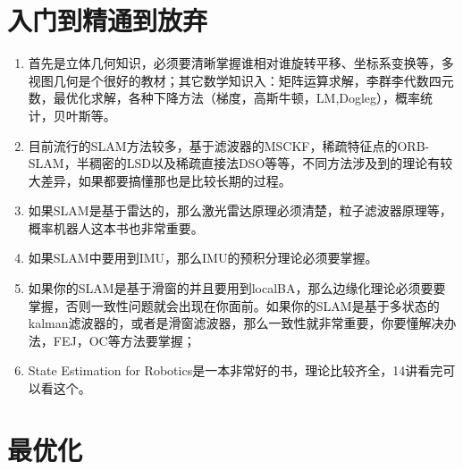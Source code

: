 \documentclass[]{elegantbook}
\author{龚正茂}
\date{\today}
\begin{document}
\maketitle
\tableofcontents  %
\mainmatter  		%









\chapter{入门到精通到放弃}

\begin{enumerate}
	\item 首先是立体几何知识，必须要清晰掌握谁相对谁旋转平移、坐标系变换等，多视图几何是个很好的教材；其它数学知识入：矩阵运算求解，李群李代数四元数，最优化求解，各种下降方法（梯度，高斯牛顿，LM,Dogleg），概率统计，贝叶斯等。
	\item 目前流行的SLAM方法较多，基于滤波器的MSCKF，稀疏特征点的ORB-SLAM，半稠密的LSD以及稀疏直接法DSO等等，不同方法涉及到的理论有较大差异，如果都要搞懂那也是比较长期的过程。
	\item 如果SLAM是基于雷达的，那么激光雷达原理必须清楚，粒子滤波器原理等，概率机器人这本书也非常重要。
	\item 如果SLAM中要用到IMU，那么IMU的预积分理论必须要掌握。
	\item 如果你的SLAM是基于滑窗的并且要用到localBA，那么边缘化理论必须要要掌握，否则一致性问题就会出现在你面前。如果你的SLAM是基于多状态的kalman滤波器的，或者是滑窗滤波器，那么一致性就非常重要，你要懂解决办法，FEJ，OC等方法要掌握；
	\item State Estimation for Robotics是一本非常好的书，理论比较齐全，14讲看完可以看这个。
\end{enumerate}
















\nocite{EINAV2010,Havrylchyk2018} 







\appendix

\chapter{最优化}\label{附录A}
\end{document}
